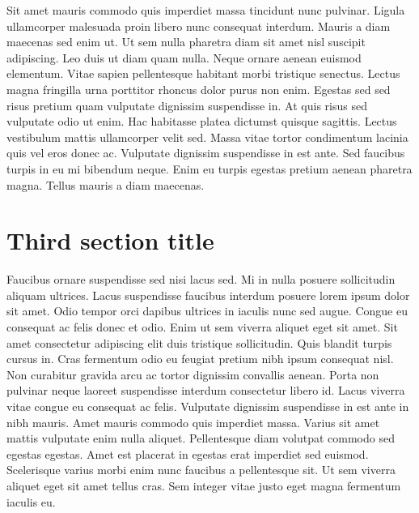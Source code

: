 Sit amet mauris commodo quis imperdiet massa tincidunt nunc pulvinar. Ligula ullamcorper malesuada proin libero nunc consequat interdum. 
Mauris a diam maecenas sed enim ut. Ut sem nulla pharetra diam sit amet nisl suscipit adipiscing. Leo duis ut diam quam nulla. Neque 
ornare aenean euismod elementum. Vitae sapien pellentesque habitant morbi tristique senectus. Lectus magna fringilla urna porttitor 
rhoncus dolor purus non enim. Egestas sed sed risus pretium quam vulputate dignissim suspendisse in. At quis risus sed vulputate odio 
ut enim. Hac habitasse platea dictumst quisque sagittis. Lectus vestibulum mattis ullamcorper velit sed. Massa vitae tortor condimentum 
lacinia quis vel eros donec ac. Vulputate dignissim suspendisse in est ante. Sed faucibus turpis in eu mi bibendum neque. Enim eu turpis 
egestas pretium aenean pharetra magna. Tellus mauris a diam maecenas.

\section{Third section title}

Faucibus ornare suspendisse sed nisi lacus sed. Mi in nulla posuere sollicitudin aliquam ultrices. Lacus suspendisse faucibus interdum 
posuere lorem ipsum dolor sit amet. Odio tempor orci dapibus ultrices in iaculis nunc sed augue. Congue eu consequat ac felis donec et 
odio. Enim ut sem viverra aliquet eget sit amet. Sit amet consectetur adipiscing elit duis tristique sollicitudin. Quis blandit turpis 
cursus in. Cras fermentum odio eu feugiat pretium nibh ipsum consequat nisl. Non curabitur gravida arcu ac tortor dignissim convallis 
aenean. Porta non pulvinar neque laoreet suspendisse interdum consectetur libero id. Lacus viverra vitae congue eu consequat ac felis. 
Vulputate dignissim suspendisse in est ante in nibh mauris. Amet mauris commodo quis imperdiet massa. Varius sit amet mattis vulputate 
enim nulla aliquet. Pellentesque diam volutpat commodo sed egestas egestas. Amet est placerat in egestas erat imperdiet sed euismod. 
Scelerisque varius morbi enim nunc faucibus a pellentesque sit. Ut sem viverra aliquet eget sit amet tellus cras. Sem integer vitae justo 
eget magna fermentum iaculis eu.